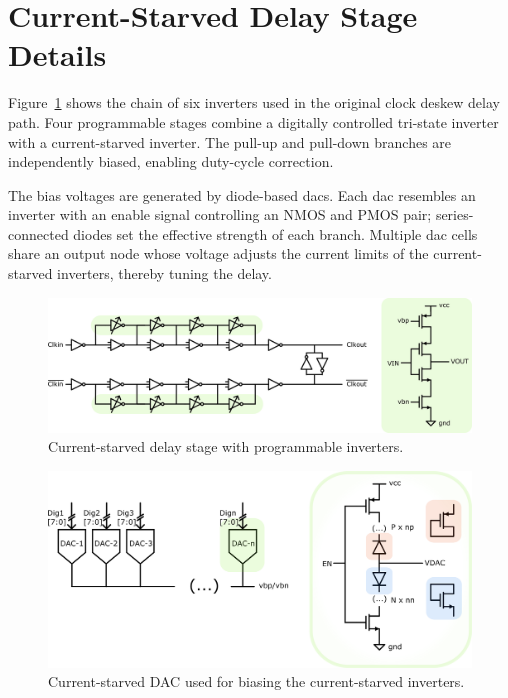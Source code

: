 \section{Current-Starved Delay Stage Details}
\label{app:cs_delay_details}

Figure~\ref{fig:current_starved_delay_stage} shows the chain of six inverters used in the original clock deskew delay path. Four programmable stages combine a digitally controlled tri-state inverter with a current-starved inverter. The pull-up and pull-down branches are independently biased, enabling duty-cycle correction.

The bias voltages are generated by diode-based \gls{dac}s. Each \gls{dac} resembles an inverter with an enable signal controlling an NMOS and PMOS pair; series-connected diodes set the effective strength of each branch. Multiple \gls{dac} cells share an output node whose voltage adjusts the current limits of the current-starved inverters, thereby tuning the delay.

\begin{figure}[htbp]
  \centering
  \includegraphics[width=0.8\linewidth]{figures/Schematics/old_chain.png}
  \caption{Current-starved delay stage with programmable inverters.}
  \label{fig:current_starved_delay_stage}
\end{figure}

\begin{figure}[htbp]
  \centering
  \includegraphics[width=0.8\linewidth]{figures/Schematics/old_DAC.png}
  \caption{Current-starved DAC used for biasing the current-starved inverters.}
  \label{fig:current_starved_dac}
\end{figure}

